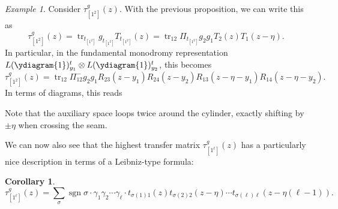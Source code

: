 \documentclass[11pt]{report}
\newtheorem{corollary}[theorem]{Corollary}
\theoremstyle{definition}
\theoremstyle{remark}
\theoremstyle{remark}
\newtheorem*{example}{Example}
\begin{document}
\begin{example}
Consider $\tau_{[1^2]}^g(z)$. With the previous proposition, we can write this as
\begin{equation*}
\tau_{[1^2]}^g(z) = \operatorname{tr}_{t_{[1^2]}} g_{t_{[1^2]}} T_{t_{[1^2]}}(z) = \operatorname{tr}_{12} \Pi_{t_{[1^2]}} g_2 g_1 T_2(z) T_1(z-\eta).
\end{equation*}
In particular, in the fundamental monodromy representation $L(\ydiagram{1})_{y_1}^t \otimes L(\ydiagram{1})_{y_2}^t$, this becomes
\begin{equation*}
\tau_{[1^2]}^g(z) = \operatorname{tr}_{12} \Pi_{12}^- g_2 g_1 R_{23}(z-y_1) R_{24}(z-y_2) R_{13}(z-\eta-y_1) R_{14}(z-\eta-y_2).
\end{equation*}
In terms of diagrams, this reads
~\\
\begin{center}
\end{center}
Note that the auxiliary space loops twice around the cylinder, exactly shifting by $\pm \eta$ when crossing the seam.
\end{example}

We can now also see that the highest transfer matrix $\tau_{[1^\ell]}^g(z)$ has a particularly nice description in terms of a Leibniz-type formula:

\begin{corollary}
\begin{equation*}
\tau_{[1^\ell]}^g(z) = \sum_\sigma \operatorname{sgn} \sigma \cdot \gamma_1 \gamma_2 \cdots \gamma_\ell \cdot t_{\sigma(1) 1}(z) t_{\sigma(2) 2}(z-\eta) \cdots t_{\sigma(\ell) \ell}(z-\eta (\ell-1)).
\end{equation*}
\end{corollary}
\end{document}
